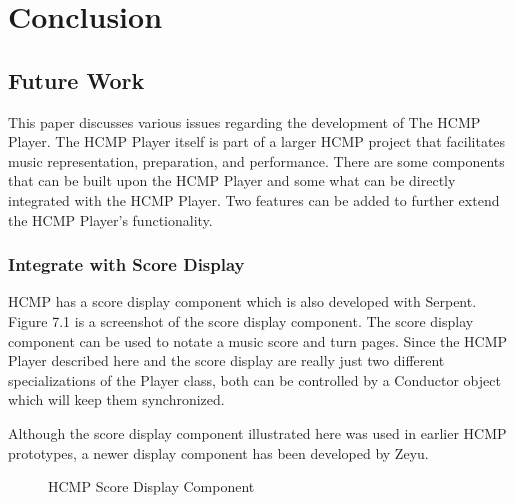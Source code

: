 \chapter{Conclusion} %

\section{Future Work}

This paper discusses various issues regarding the development of 
The HCMP Player. The HCMP Player itself is part of a larger HCMP project 
that facilitates music representation, preparation, and performance.
There are some components that can be built upon the HCMP Player and some 
what can be directly integrated with the HCMP Player. Two
features can be added to further extend the HCMP Player's functionality. 

\subsection{Integrate with Score Display}
HCMP has a score display component which is also developed with Serpent.
Figure 7.1 is a screenshot of the score display component. The score 
display component can be used to notate a music score and turn
pages. Since the HCMP Player described here and the score display 
are really just two different specializations of the Player class,
both can be controlled by a Conductor object which will keep them synchronized.

Although the score display component illustrated here was used in earlier 
HCMP prototypes, a newer display component has been developed by Zeyu.

\begin{figure}[H]
\caption{HCMP Score Display Component \cite{Dawen:ISMIR2011}}
\end{figure}

